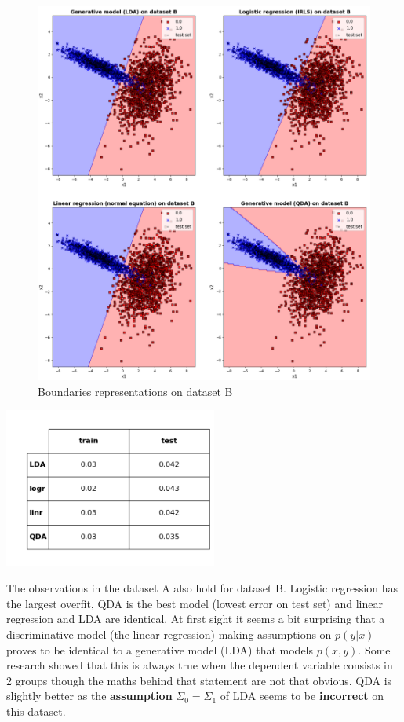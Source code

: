 \documentclass[a4paper, 11pt]{article}
\begin{document}
\newpage

\begin{figure}[!h]
\centering
\includegraphics[width=16cm]{dataset_B_crop.png}
\caption{Boundaries representations on dataset B}
\end{figure}

\noindent\begin{minipage}[b]{0.5\linewidth}
\centering
\includegraphics[width=7cm]{dataset_B_table.png}
\end{minipage}%
\hfill
\begin{minipage}[b]{0.5\linewidth}
The observations in the dataset A also hold for dataset B. Logistic regression has the largest overfit, QDA is the
best model (lowest error on test set) and linear regression and LDA are identical. At first sight it seems a bit
surprising that a discriminative model (the linear regression) making assumptions on $p(y|x)$ proves to be identical to
a generative model (LDA) that models $p(x,y)$. Some research showed that this is always true when the
dependent variable consists in 2 groups though the maths behind that statement are not that obvious. QDA is slightly
better as the \textbf{assumption} $\Sigma_0 = \Sigma_1$ of LDA seems to be \textbf{incorrect} on this dataset.
\end{minipage}
\end{document}
